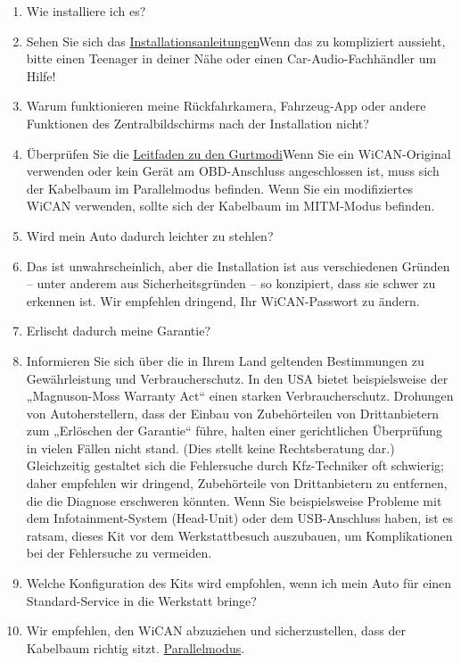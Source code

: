 \documentclass[superscriptaddress,onecolumn,floatfix]{revtex4-2}
\begin{document}
\begin{enumerate}
  \item[F:] Wie installiere ich es?
  \item[A:] Sehen Sie sich das \href{https://github.com/tylerharvey/Ioniq5_CAN/blob/main/guides/}{Installationsanleitungen}Wenn das zu kompliziert aussieht, bitte einen Teenager in deiner Nähe oder einen Car-Audio-Fachhändler um Hilfe!
  \item[F:] Warum funktionieren meine Rückfahrkamera, Fahrzeug-App oder andere Funktionen des Zentralbildschirms nach der Installation nicht?
  \item[A:] Überprüfen Sie die \href{https://github.com/tylerharvey/Ioniq5_CAN/blob/main/guides/harnesses/head_unit_MITM/MITM_harness_modes.pdf}{Leitfaden zu den Gurtmodi}Wenn Sie ein WiCAN-Original verwenden oder kein Gerät am OBD-Anschluss angeschlossen ist, muss sich der Kabelbaum im Parallelmodus befinden. Wenn Sie ein modifiziertes WiCAN verwenden, sollte sich der Kabelbaum im MITM-Modus befinden.
  \item[F:] Wird mein Auto dadurch leichter zu stehlen?
  \item[A:] Das ist unwahrscheinlich, aber die Installation ist aus verschiedenen Gründen – unter anderem aus Sicherheitsgründen – so konzipiert, dass sie schwer zu erkennen ist. Wir empfehlen dringend, Ihr WiCAN-Passwort zu ändern. 
  \item[F:] Erlischt dadurch meine Garantie?
  \item[A:] Informieren Sie sich über die in Ihrem Land geltenden Bestimmungen zu Gewährleistung und Verbraucherschutz. In den USA bietet beispielsweise der „Magnuson-Moss Warranty Act“ einen starken Verbraucherschutz. Drohungen von Autoherstellern, dass der Einbau von Zubehörteilen von Drittanbietern zum „Erlöschen der Garantie“ führe, halten einer gerichtlichen Überprüfung in vielen Fällen nicht stand. (Dies stellt keine Rechtsberatung dar.) Gleichzeitig gestaltet sich die Fehlersuche durch Kfz-Techniker oft schwierig; daher empfehlen wir dringend, Zubehörteile von Drittanbietern zu entfernen, die die Diagnose erschweren könnten. Wenn Sie beispielsweise Probleme mit dem Infotainment-System (Head-Unit) oder dem USB-Anschluss haben, ist es ratsam, dieses Kit vor dem Werkstattbesuch auszubauen, um Komplikationen bei der Fehlersuche zu vermeiden. 
  \item[F:] Welche Konfiguration des Kits wird empfohlen, wenn ich mein Auto für einen Standard-Service in die Werkstatt bringe?
  \item[A:] Wir empfehlen, den WiCAN abzuziehen und sicherzustellen, dass der Kabelbaum richtig sitzt. \href{https://github.com/tylerharvey/Ioniq5_CAN/blob/main/guides/harnesses/head_unit_MITM/MITM_harness_modes.pdf}{Parallelmodus}.

\end{enumerate}
\end{document}

